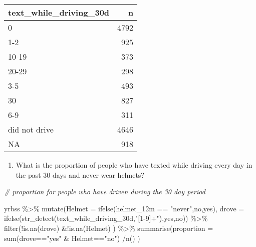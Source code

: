 \documentclass[
]{article}
\newenvironment{Shaded}{\begin{snugshade}}{\end{snugshade}}
\newcommand{\AttributeTok}[1]{\textcolor[rgb]{0.77,0.63,0.00}{#1}}
\newcommand{\CommentTok}[1]{\textcolor[rgb]{0.56,0.35,0.01}{\textit{#1}}}
\newcommand{\FunctionTok}[1]{\textcolor[rgb]{0.00,0.00,0.00}{#1}}
\newcommand{\NormalTok}[1]{#1}
\newcommand{\SpecialCharTok}[1]{\textcolor[rgb]{0.00,0.00,0.00}{#1}}
\newcommand{\StringTok}[1]{\textcolor[rgb]{0.31,0.60,0.02}{#1}}
\providecommand{\tightlist}{%
  \setlength{\itemsep}{0pt}\setlength{\parskip}{0pt}}
\begin{document}
\begin{longtable}[]{@{}lr@{}}
\toprule
text\_while\_driving\_30d & n \\
\midrule
\endhead
0 & 4792 \\
1-2 & 925 \\
10-19 & 373 \\
20-29 & 298 \\
3-5 & 493 \\
30 & 827 \\
6-9 & 311 \\
did not drive & 4646 \\
NA & 918 \\
\bottomrule
\end{longtable}

\begin{enumerate}
\def\labelenumi{\arabic{enumi}.}
\setcounter{enumi}{1}
\tightlist
\item
  What is the proportion of people who have texted while driving every
  day in the past 30 days and never wear helmets?
\end{enumerate}

\begin{Shaded}
\begin{Highlighting}[]
 \CommentTok{\# proportion for people who have driven during the 30 day period}

\NormalTok{yrbss }\SpecialCharTok{\%\textgreater{}\%}
\FunctionTok{mutate}\NormalTok{(}\AttributeTok{Helmet =} \FunctionTok{ifelse}\NormalTok{(helmet\_12m }\SpecialCharTok{==} \StringTok{"never"}\NormalTok{,}\StringTok{\textquotesingle{}no\textquotesingle{}}\NormalTok{,}\StringTok{\textquotesingle{}yes\textquotesingle{}}\NormalTok{), }\AttributeTok{drove =} \FunctionTok{ifelse}\NormalTok{(}\FunctionTok{str\_detect}\NormalTok{(text\_while\_driving\_30d,}\StringTok{"[1{-}9]+"}\NormalTok{),}\StringTok{\textquotesingle{}yes\textquotesingle{}}\NormalTok{,}\StringTok{\textquotesingle{}no\textquotesingle{}}\NormalTok{)) }\SpecialCharTok{\%\textgreater{}\%}
\FunctionTok{filter}\NormalTok{(}\SpecialCharTok{!}\FunctionTok{is.na}\NormalTok{(drove) }\SpecialCharTok{\&!}\FunctionTok{is.na}\NormalTok{(Helmet) ) }\SpecialCharTok{\%\textgreater{}\%}
\FunctionTok{summarise}\NormalTok{(}\AttributeTok{proportion =} \FunctionTok{sum}\NormalTok{(drove}\SpecialCharTok{==}\StringTok{"yes"} \SpecialCharTok{\&}\NormalTok{ Helmet}\SpecialCharTok{==}\StringTok{"no"}\NormalTok{) }\SpecialCharTok{/}\FunctionTok{n}\NormalTok{() )}
\end{Highlighting}
\end{Shaded}
\end{document}
